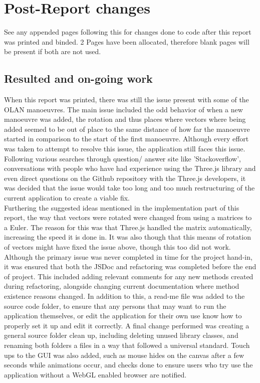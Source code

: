 \chapter{Post-Report changes}

See any appended pages following this for changes done to code after this report was printed and binded. 2 Pages have been allocated, therefore blank pages will be present if both are not used.

\clearpage

\section{Resulted and on-going work}
When this report was printed, there was still the issue present with some of the OLAN manoeuvres. The main issue included the odd behavior of when a new manoeuvre was added, the rotation and thus places where vectors where being added seemed to be out of place to the same distance of how far the manoeuvre started in comparison to the start of the first manoeuvre. Although every effort was taken to attempt to resolve this issue, the application still faces this issue. Following various searches through question/ answer site like 'Stackoverflow', conversations with people who have had experience using the Three.js library and even direct questions on the Github repository with the Three.js developers, it was decided that the issue would take too long and too much restructuring of the current application to create a viable fix. \\

Furthering the suggested ideas mentioned in the implementation part of this report, the way that vectors were rotated were changed from using a matrices to a Euler. The reason for this was that Three.js handled the matrix automatically, increasing the speed it is done in. It was also though that this means of rotation of vectors might have fixed the issue above, though this too did not work. \\

Although the primary issue was never completed in time for the project hand-in, it was ensured that both the JSDoc and refactoring was completed before the end of project. This included adding relevant comments for any new methods created during refactoring, alongside changing current documentation where method existence reasons changed. In addition to this, a read-me file was added to the source code folder, to ensure that any persons that may want to run the application themselves, or edit the application for their own use know how to properly set it up and edit it correctly. A final change performed was creating a general source folder clean up, including deleting unused library classes, and renaming both folders a files in a way that followed a universal standard. Touch ups to the GUI was also added, such as mouse hides on the canvas after a few seconds while animations occur, and checks done to ensure users who try use the application without a WebGL enabled browser are notified.

